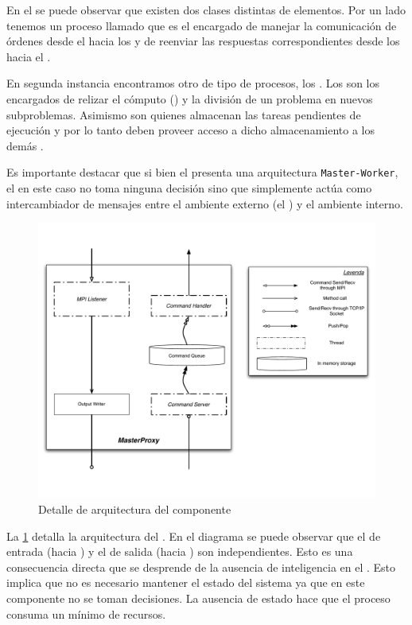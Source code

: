 En el \bend se puede observar que existen dos clases distintas de elementos.
Por un lado tenemos un proceso llamado \master que es el encargado de manejar
la comunicación de órdenes desde el \fend hacia los \ws y de reenviar las
respuestas correspondientes desde los \ws hacia el \fend.

En segunda instancia encontramos otro de tipo de procesos, los \ws. Los \ws
son los encargados de relizar el cómputo (\ssolving) y la división de un
problema en nuevos subproblemas. Asimismo son quienes almacenan las tareas
pendientes de ejecución y por lo tanto deben proveer acceso a dicho
almacenamiento a los demás \ws.

\newcommand{\masterslave}{\texttt{Master-Worker}\xspace}

Es importante destacar que si bien el \bend presenta una arquitectura
\masterslave, el \master en este caso no toma ninguna decisión sino que
simplemente actúa como intercambiador de mensajes entre el ambiente externo
(el \fend) y el ambiente interno.

\begin{figure}[h!]
\centering
\includegraphics[scale=0.4]{graphs/master proxy detail}
\caption{Detalle de arquitectura del componente \master}
\label{fig:masterproxydetail}
\end{figure}

La \fig\ref{fig:masterproxydetail} detalla la arquitectura del \master. En el
diagrama se puede observar que el \datapath de entrada (\fend hacia \bend) y
el de salida (\bend hacia \fend) son independientes. Esto es una consecuencia
directa que se desprende de la ausencia de inteligencia en el \master. Esto
implica que no es necesario mantener el estado del sistema ya que en este
componente no se toman decisiones. La ausencia de estado hace que el proceso
\master consuma un mínimo de recursos.

